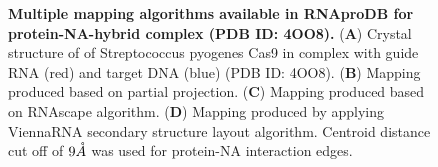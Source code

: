\begin{center}
    \begin{figure}[H]
         \caption[Multiple mapping algorithms available in RNAproDB for protein-NA-hybrid complex (PDB ID: 4OO8)]{\textbf{Multiple mapping algorithms available in RNAproDB for protein-NA-hybrid complex (PDB ID: 4OO8).} ({\bf A}) Crystal structure of of Streptococcus pyogenes Cas9 in complex with guide RNA (red) and target DNA (blue) (PDB ID: 4OO8).  ({\bf B})  Mapping produced based on partial projection. ({\bf C}) Mapping produced based on RNAscape algorithm. ({\bf D}) Mapping produced by applying ViennaRNA secondary structure layout algorithm. Centroid distance cut off of $9 \AA$ was used for protein-NA interaction edges.}
  \label{fig:rnaprodbS3}
\end{figure}
\end{center}
